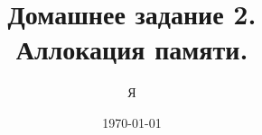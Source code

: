 \documentclass[12pt,a4paper,oneside]{article}
\title{Домашнее задание 2. \\ Аллокация памяти.}
\author{Я}
\date{\today}
\begin{document}
  \sloppy
  \maketitle
  \tableofcontents
  \clearpage

  
  
  
  
  
  

  {}
  
\end{document}
